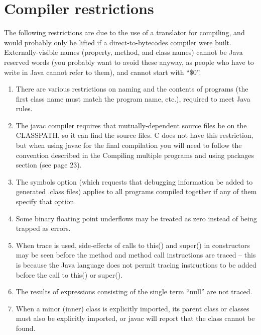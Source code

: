 \section{Compiler restrictions }
The following restrictions are due to the use of a translator for compiling, and would probably only be lifted if a direct-to-bytecodes \nr{} compiler were built. 
Externally-visible names (property, method, and class names) cannot be Java reserved words (you probably want to avoid these anyway, as people who have to write in Java cannot refer to them), and cannot start with “\$0”.
\begin{enumerate}
\item There are various restrictions on naming and the contents of programs (the first class name must match the program name, etc.), required to meet Java rules. 
\item The javac compiler requires that mutually-dependent source files be on the CLASSPATH, so it can find the source files. \nr{}C does not have this restriction, but when using javac for the final compilation you will need to follow the convention described in the Compiling multiple programs and using packages section (see page 23). 
\item The symbols option (which requests that debugging information be added to generated .class files) applies to all programs compiled together if any of them specify that option. 
\item Some binary floating point underflows may be treated as zero instead of being trapped as errors. 
\item When trace is used, side-effects of calls to this() and super() in constructors may be seen before the method and method call instructions are traced – this is because the Java language does not permit tracing instructions to be added before the call to this() or super(). 
\item The results of expressions consisting of the single term “null” are not traced. 
\item When a minor (inner) class is explicitly imported, its parent class or classes must 
also be explicitly imported, or javac will report that the class cannot be found. 
\end{enumerate}
